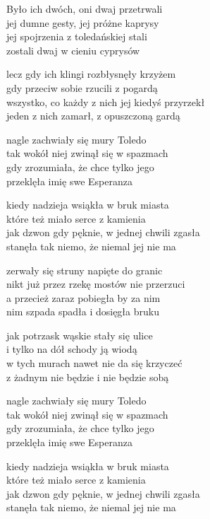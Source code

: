 \begin{text}
    \hfill\break
Było ich dwóch, oni dwaj przetrwali\\
jej dumne gesty, jej próżne kaprysy\\
jej spojrzenia z toledańskiej stali\\
zostali dwaj w cieniu cyprysów

lecz gdy ich klingi rozbłysnęły krzyżem\\
gdy przeciw sobie rzucili z pogardą\\
wszystko, co każdy z nich jej kiedyś przyrzekł\\
jeden z nich zamarł, z opuszczoną gardą

nagle zachwiały się mury Toledo\\
tak wokół niej zwinął się w spazmach\\
gdy zrozumiała, że chce tylko jego\\
przeklęła imię swe Esperanza

kiedy nadzieja wsiąkła w bruk miasta\\
które też miało serce z kamienia\\
jak dzwon gdy pęknie, w jednej chwili zgasła\\
stanęła tak niemo, że niemal jej nie ma

zerwały się struny napięte do granic\\
nikt już przez rzekę mostów nie przerzuci\\
a przecież zaraz pobiegła by za nim\\
nim szpada spadła i dosięgła bruku

jak potrzask wąskie stały się ulice\\
i tylko na dół schody ją wiodą\\
w tych murach nawet nie da się krzyczeć\\
z żadnym nie będzie i nie będzie sobą

nagle zachwiały się mury Toledo\\
tak wokół niej zwinął się w spazmach\\
gdy zrozumiała, że chce tylko jego\\
przeklęła imię swe Esperanza

kiedy nadzieja wsiąkła w bruk miasta\\
które też miało serce z kamienia\\
jak dzwon gdy pęknie, w jednej chwili zgasła\\
stanęła tak niemo, że niemal jej nie ma
\end{text}
